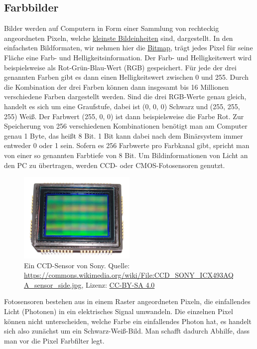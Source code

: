 \documentclass[10pt,a4paper,titlepage]{article}
\begin{document}
\subsection{Farbbilder}
Bilder werden auf Computern in Form einer Sammlung von rechteckig angeordneten Pixeln, welche \href{https://de.wikipedia.org/wiki/Rastergrafik}{kleinste Bildeinheiten} sind, dargestellt. In den einfachsten Bildformaten, wir nehmen hier die \href{https://de.wikipedia.org/wiki/Windows_Bitmap}{Bitmap}, trägt jedes Pixel für seine Fläche eine Farb- und Helligkeitsinformation. Der Farb- und Helligkeitswert wird beispielsweise als Rot-Grün-Blau-Wert (RGB) gespeichert. Für jede der drei genannten Farben gibt es dann einen Helligkeitswert zwischen 0 und 255. Durch die Kombination der drei Farben können dann insgesamt bis 16 Millionen verschiedene Farben dargestellt werden. Sind die drei RGB-Werte genau gleich, handelt es sich um eine Graufstufe, dabei ist (0, 0, 0) Schwarz und (255, 255, 255) Weiß. Der Farbwert (255, 0, 0) ist dann beispielsweise die Farbe Rot. Zur Speicherung von 256 verschiedenen Kombinationen benötigt man am Computer genau 1 Byte, das heißt 8 Bit. 1 Bit kann dabei nach dem Binärsystem immer entweder 0 oder 1 sein. Sofern es 256 Farbwerte pro Farbkanal gibt, spricht man von einer so genannten Farbtiefe von 8 Bit. Um Bildinformationen von Licht an den PC zu übertragen, werden CCD- oder CMOS-Fotosensoren genutzt.
\begin{figure}[h!]
  \centering
    \includegraphics[width=0.5\textwidth]{Sony-CCD-Sensor}
  \caption{Ein CCD-Sensor von Sony. Quelle: \url{https://commons.wikimedia.org/wiki/File:CCD_SONY_ICX493AQA_sensor_side.jpg}, Lizenz: \href{https://creativecommons.org/licenses/by-sa/4.0/deed.en}{CC-BY-SA 4.0}}
  \label{fig:sony-ccd}
\end{figure}
Fotosensoren bestehen aus in einem Raster angeordneten Pixeln, die einfallendes Licht (Photonen) in ein elektrisches Signal umwandeln. Die einzelnen Pixel können nicht unterscheiden, welche Farbe ein einfallendes Photon hat, es handelt sich also zunächst um ein Schwarz-Weiß-Bild. Man schafft dadurch Abhilfe, dass man vor die Pixel Farbfilter legt.
\end{document}
